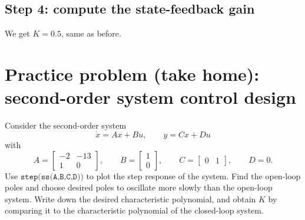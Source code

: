 \documentclass{ee122_notes}
\begin{document}
\subsection*{Step 4: compute the state-feedback gain}
We get 
$K=0.5$, same as before. 

\section{Practice problem (take home): second-order system control design}

Consider the second-order system
\[
\dot{x}=Ax+Bu,
\qquad
y=Cx+Du
\]
with
\[
A=\begin{bmatrix}
-2 & -13\\
1 & 0
\end{bmatrix},
\qquad
B=\begin{bmatrix}
1\\
0
\end{bmatrix},
\qquad
C=\begin{bmatrix}
0 & 1
\end{bmatrix},
\qquad
D=0.
\]
Use \(
\texttt{step(ss(A,B,C,D))}
\) to plot the step response of the system. Find the open-loop poles and choose desired poles to oscillate more slowly than the open-loop system. Write down  the desired characteristic polynomial, and obtain $K$ by comparing it to the characteristic polynomial of the closed-loop system. 
\end{document}
